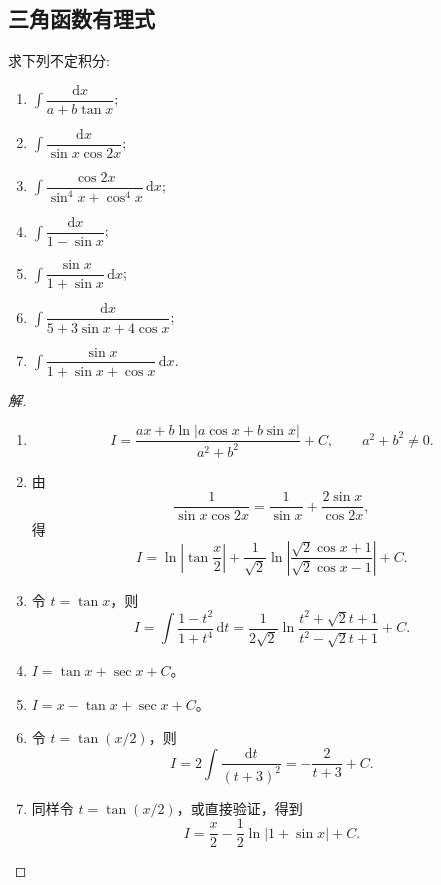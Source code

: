 \documentclass[../../数学分析培优讲义(答案版).tex]{subfiles}
\begin{document}
\subsection{三角函数有理式}

\begin{example}
求下列不定积分:
\begin{enumerate}[label=(\arabic*)]
    \item $\displaystyle\int\dfrac{\mathrm{d}x}{a+b\tan x}$;
    \item $\displaystyle\int\dfrac{\mathrm{d}x}{\sin x\cos2x}$;
    \item $\displaystyle\int\dfrac{\cos2x}{\sin^4x+\cos^4x}\,\mathrm{d}x$;
    \item $\displaystyle\int\dfrac{\mathrm{d}x}{1-\sin x}$;
    \item $\displaystyle\int\dfrac{\sin x}{1+\sin x}\,\mathrm{d}x$;
    \item $\displaystyle\int\dfrac{\mathrm{d}x}{5+3\sin x+4\cos x}$;
    \item $\displaystyle\int\dfrac{\sin x}{1+\sin x+\cos x}\,\mathrm{d}x$.
\end{enumerate}
\end{example}

\begin{proof}[解]
\begin{enumerate}[label=(\arabic*)]
    \item
    \[
        I=\dfrac{ax+b\ln|a\cos x+b\sin x|}{a^2+b^2}+C,
        \qquad a^2+b^2\neq0.
    \]
    \item 由
    \[
        \dfrac{1}{\sin x\cos2x}=\dfrac{1}{\sin x}+\dfrac{2\sin x}{\cos2x},
    \]
    得
    \[
        I=\ln\left|\tan\dfrac{x}{2}\right|
        +\dfrac{1}{\sqrt2}\ln\left|\dfrac{\sqrt2\cos x+1}{\sqrt2\cos x-1}\right|+C.
    \]
    \item 令 $t=\tan x$，则
    \[
        I=\int\dfrac{1-t^2}{1+t^4}\,\mathrm{d}t
        =\dfrac{1}{2\sqrt2}\ln\dfrac{t^2+\sqrt2t+1}{t^2-\sqrt2t+1}+C.
    \]
    \item $\displaystyle I=\tan x+\sec x+C$。
    \item $\displaystyle I=x-\tan x+\sec x+C$。
    \item 令 $t=\tan(x/2)$，则
    \[
        I=2\int\dfrac{\mathrm{d}t}{(t+3)^2}
        =-\dfrac{2}{t+3}+C.
    \]
    \item 同样令 $t=\tan(x/2)$，或直接验证，得到
    \[
        I=\dfrac{x}{2}-\dfrac{1}{2}\ln|1+\sin x|+C.
    \]
\end{enumerate}
\end{proof}
\end{document}
